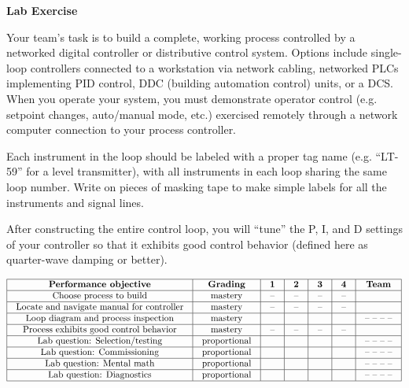 




\noindent
{\bf Lab Exercise}

\vskip 5pt

Your team's task is to build a complete, working process controlled by a networked digital controller or distributive control system.  Options include single-loop controllers connected to a workstation via network cabling, networked PLCs implementing PID control, DDC (building automation control) units, or a DCS.  When you operate your system, you must demonstrate operator control (e.g. setpoint changes, auto/manual mode, etc.) exercised remotely through a network computer connection to your process controller.

Each instrument in the loop should be labeled with a proper tag name (e.g. ``LT-59'' for a level transmitter), with all instruments in each loop sharing the same loop number.  Write on pieces of masking tape to make simple labels for all the instruments and signal lines.

After constructing the entire control loop, you will ``tune'' the P, I, and D settings of your controller so that it exhibits good control behavior (defined here as quarter-wave damping or better).

\vskip 10pt



$$\vbox{\offinterlineskip
\halign{\strut
\vrule \quad\hfil # \ \hfil & 
\vrule \quad\hfil # \ \hfil & 
\vrule \quad\hfil # \ \hfil & 
\vrule \quad\hfil # \ \hfil & 
\vrule \quad\hfil # \ \hfil & 
\vrule \quad\hfil # \ \hfil & 
\vrule \quad\hfil # \ \hfil \vrule \cr
\noalign{\hrule}
%
{\bf Performance objective} & {\bf Grading} & {\bf 1} & {\bf 2} & {\bf 3} & {\bf 4} & {\bf Team} \cr
%
\noalign{\hrule}
%
Choose process to build & mastery & -- & -- & -- & -- & \cr
%
\noalign{\hrule}
%
Locate and navigate manual for controller & mastery & -- & -- & -- & -- & \cr
%
\noalign{\hrule}
%
Loop diagram and process inspection & mastery & & & & & -- -- -- -- \cr
%
\noalign{\hrule}
%
Process exhibits good control behavior & mastery & -- & -- & -- & -- &  \cr
%
\noalign{\hrule}
%
Lab question: Selection/testing & proportional &  &  &  &  & -- -- -- -- \cr
%
\noalign{\hrule}
%
Lab question: Commissioning & proportional &  &  &  &  & -- -- -- -- \cr
%
\noalign{\hrule}
%
Lab question: Mental math & proportional &  &  &  &  & -- -- -- -- \cr
%
\noalign{\hrule}
%
Lab question: Diagnostics & proportional &  &  &  &  & -- -- -- -- \cr
%
\noalign{\hrule}
} %
}$$ %


